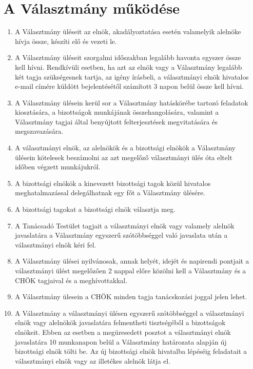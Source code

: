 \documentclass{../styles/rulebook}
\begin{document}
\section{A Választmány működése}

\begin{enumerate}
	\item A Választmány üléseit az elnök, akadályoztatása esetén valamelyik alelnöke hívja össze, készíti elő és vezeti le.
	\item A Választmány üléseit szorgalmi időszakban legalább havonta egyszer össze kell hívni. Rendkívüli esetben, ha azt az elnök vagy a Választmány legalább két tagja szükségesnek tartja, az igény írásbeli, a választmányi elnök hivatalos e-mail címére küldött bejelentésétől számított 3 napon belül össze kell hívni.
	\item A Választmány ülésein kerül sor a Választmány hatáskörébe tartozó feladatok kiosztására, a bizottságok munkájának összehangolására, valamint a Választmány tagjai által benyújtott felterjesztések megvitatására és megszavazására.
	\item A választmányi elnök, az alelnökök és a bizottsági elnökök a Választmány ülésein kötelesek beszámolni az azt megelőző választmányi ülés óta eltelt időben végzett munkájukról.
	\item A bizottsági elnökök a kinevezett bizottsági tagok közül hivatalos meghatalmazással delegálhatnak egy főt a Választmány ülésére.
	\item A bizottsági tagokat a bizottsági elnök választja meg.
	\item A Tanácsadó Testület tagjait a választmányi elnök vagy valamely alelnök javaslatára a Választmány egyszerű szótöbbséggel való javaslata után a választmányi elnök kéri fel.
	\item A Választmány ülései nyilvánosak, annak helyét, idejét és napirendi pontjait a választmányi ülést megelőzően 2 nappal előre közölni kell a Választmány és a CHÖK tagjaival és a meghívottakkal.
	\item A Választmány ülesein a CHÖK minden tagja tanácskozási joggal jelen lehet.
	\item A Választmány a választmányi ülésen egyszerű szótöbbséggel a választmányi elnök vagy alelnökök javaslatára felmentheti tisztségéből a bizottságok elnökeit. Ebben az esetben a megüresedett posztot a választmányi elnök javaslatára 10 munkanapon belül a Választmány határozata alapján új bizottsági elnök tölti be. Az új bizottsági elnök hivatalba lépéséig feladatait a választmányi elnök vagy az illetékes alelnök látja el.

\end{enumerate}
\end{document}
